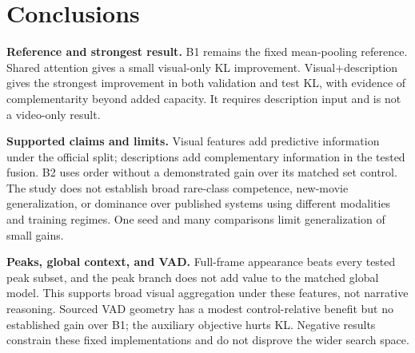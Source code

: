 \documentclass[11pt,a4paper]{article}
\begin{document}
\section{Conclusions}
\textbf{Reference and strongest result.} B1 remains the fixed mean-pooling reference. Shared attention gives a small visual-only KL improvement. Visual+description gives the strongest improvement in both validation and test KL, with evidence of complementarity beyond added capacity. It requires description input and is not a video-only result.

\textbf{Supported claims and limits.} Visual features add predictive information under the official split; descriptions add complementary information in the tested fusion. B2 uses order without a demonstrated gain over its matched set control. The study does not establish broad rare-class competence, new-movie generalization, or dominance over published systems using different modalities and training regimes. One seed and many comparisons limit generalization of small gains.

\textbf{Peaks, global context, and VAD.} Full-frame appearance beats every tested peak subset, and the peak branch does not add value to the matched global model. This supports broad visual aggregation under these features, not narrative reasoning. Sourced VAD geometry has a modest control-relative benefit but no established gain over B1; the auxiliary objective hurts KL. Negative results constrain these fixed implementations and do not disprove the wider search space.
\end{document}
